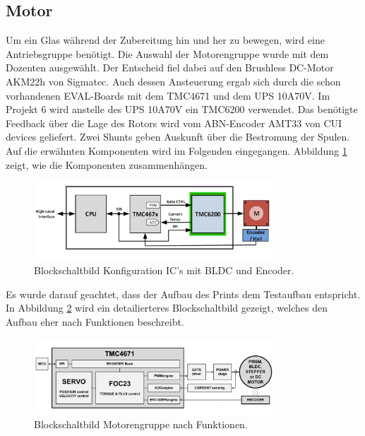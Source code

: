 \clearpage
\subsection{Motor}
\label{subsec:Motor}

Um ein Glas während der Zubereitung hin und her zu bewegen, wird eine Antriebsgruppe benötigt. Die Auswahl der Motorengruppe wurde mit dem Dozenten ausgewählt. Der Entscheid fiel dabei auf den Brushless DC-Motor AKM22h von Sigmatec. Auch dessen Ansteuerung ergab sich durch die schon vorhandenen EVAL-Boards mit dem TMC4671 und dem UPS 10A70V. Im Projekt 6 wird anstelle des UPS 10A70V ein TMC6200 verwendet. Das benötigte Feedback über die Lage des Rotors wird vom ABN-Encoder AMT33 von CUI devices geliefert. Zwei Shunts geben Auskunft über die Bestromung der Spulen. Auf die erwähnten Komponenten wird im Folgenden eingegangen. Abbildung \ref{fig:Blockdiagramm_TMC4671_und_TMC6200} zeigt, wie die Komponenten zusammenhängen.

\begin{figure}[H]
	\centering
	\includegraphics[width=0.8\textwidth]{graphics/Blockdiagramm_TMC4671_und_TMC6200}
	\caption{Blockschaltbild Konfiguration IC's mit BLDC und Encoder. \cite[S.1]{trinamicmotion_control_gmbh__co_kg_tmc6200_2019}}
	\label{fig:Blockdiagramm_TMC4671_und_TMC6200}
\end{figure}

Es wurde darauf geachtet, dass der Aufbau des Prints dem Testaufbau entspricht. In Abbildung \ref{fig:Blockdiagramm_Motorengruppe} wird ein detailierteres Blockschaltbild gezeigt, welches den Aufbau eher nach Funktionen beschreibt.

\begin{figure}[H]
	\centering
	\includegraphics[width=0.8\textwidth]{graphics/Blockdiagramm_Motorengruppe}
	\caption{Blockschaltbild Motorengruppe nach Funktionen. \cite[S.1]{trinamicmotion_control_gmbh__co_kg_tmc4671_2019}}
	\label{fig:Blockdiagramm_Motorengruppe}
\end{figure}

